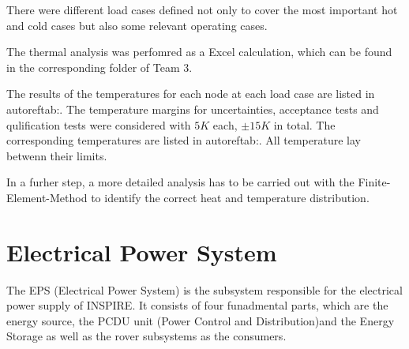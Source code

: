 There were different load cases defined not only to cover the most important hot and cold cases but also some relevant operating cases.



The thermal analysis was perfomred as a Excel calculation, which can be found in the corresponding folder of Team 3.


The results of the temperatures for each node at each load case are listed in autoref{tab:}.
The temperature margins for uncertainties, acceptance tests and qulification tests were considered with $5 K$ each, $\pm 15K$ in total.
The corresponding temperatures are listed in autoref{tab:}.
All temperature lay betwenn their limits.


In a furher step, a more detailed analysis has to be carried out with the Finite-Element-Method to identify the correct heat and temperature distribution.\\

\clearpage

\section{Electrical Power System}
\label{sec:EPS}
The EPS (Electrical Power System) is the subsystem responsible for the electrical power supply of INSPIRE. It consists of four funadmental parts, which are the energy source, the PCDU unit (Power Control and Distribution)and the Energy Storage as well as the rover subsystems as the consumers.

